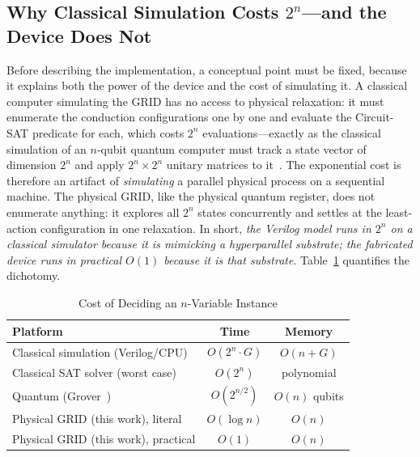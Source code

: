 \documentclass[letterpaper,journal]{IEEEtran}
\begin{document}
\subsection{Why Classical Simulation Costs $2^{n}$---and the Device Does Not}
Before describing the implementation, a conceptual point must be fixed,
because it explains both the power of the device and the cost of simulating
it. A classical computer simulating the GRID has no access to physical
relaxation: it must enumerate the conduction configurations one by one and
evaluate the Circuit-SAT predicate for each, which costs $2^{n}$
evaluations---exactly as the classical simulation of an $n$-qubit quantum
computer must track a state vector of dimension $2^{n}$ and apply
$2^{n}\times 2^{n}$ unitary matrices to
it~\cite{nielsen2000,bernstein1997}. The exponential cost is therefore an
artifact of \emph{simulating} a parallel physical process on a sequential
machine. The physical GRID, like the physical quantum register, does not
enumerate anything: it explores all $2^{n}$ states concurrently and settles
at the least-action configuration in one relaxation. In short, \emph{the
Verilog model runs in $2^{n}$ on a classical simulator because it is
mimicking a hyperparallel substrate; the fabricated device runs in
practical $O(1)$ because it \emph{is} that substrate}.
Table~\ref{tab:scaling} quantifies the dichotomy.

\begin{table}[!t]
\centering
\caption{Cost of Deciding an $n$-Variable Instance}
\label{tab:scaling}
\begin{tabular}{lcc}
\toprule
\textbf{Platform} & \textbf{Time} & \textbf{Memory} \\
\midrule
Classical simulation (Verilog/CPU) & $O(2^{n}\cdot G)$ & $O(n+G)$ \\
Classical SAT solver (worst case) & $O(2^{n})$ & polynomial \\
Quantum (Grover~\cite{grover1996}) & $O(2^{n/2})$ & $O(n)$ qubits \\
Physical GRID (this work), literal & $O(\log n)$ & $O(n)$ \\
Physical GRID (this work), practical & $O(1)$ & $O(n)$ \\
\bottomrule
\end{tabular}
\end{table}
\end{document}

